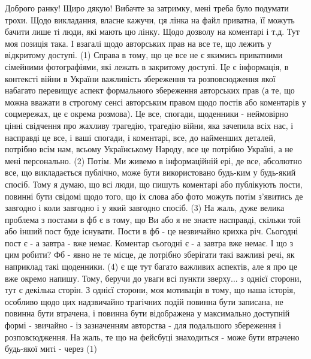  
 
 
 
 

Доброго ранку! Щиро дякую! Вибачте за затримку, мені треба було подумати трохи. 
Щодо викладання, власне кажучи, ця лінка на файл
приватна, її можуть бачити лише ті люди, які мають цю лінку. Щодо дозволу на
коментарі і т.д. Тут моя позиція така.  І взагалі щодо авторських прав на все
те, що лежить у відкритому доступі. (1)  Справа в тому, що це все не є якимись
приватними сімейними фотографіями, які лежать в закритому доступі. Це є
інформація, в контексті війни в України важливість збереження та розповсюдження
якої набагато перевищує аспект формального збереження авторських прав (а те,
що можна вважати в строгому сенсі авторським правом щодо постів або коментарів у соцмережах, це є окрема
розмова). Це все,
спогади, щоденники - неймовірно цінні свідчення про жахливу трагедію, трагедію
війни, яка зачепила всіх нас, і насправді це все, і ваші спогади, і коментарі,
все, до найменших деталей, потрібно всім нам, всьому Українському Народу, все
це потрібно Україні, а не мені персонально. (2) Потім. Ми живемо в
інформаційній ері, де все, абсолютно все, що викладається публічно, може бути
використовано будь-ким у будь-який спосіб. Тому я думаю, що всі люди, що пишуть
коментарі або публікують пости, повинні бути свідомі щодо того, що іх слова або
фото можуть потім з'явитись де завгодно і коли завгодно і у який завгодно
спосіб. (3) На жаль, дуже велика проблема з постами в фб є в тому, що Ви або я
не знаєте насправді, скільки той або інший пост буде існувати.  Пости в фб - це
незвичайно крихка річ. Сьогодні пост є - а завтра - вже немає. Коментар
сьогодні є - а завтра вже немає.  І що з цим робити? Фб - явно не те місце, де
потрібно зберігати такі важливі речі, як наприклад такі щоденники. (4) є ще тут багато важливих аспектів, 
але я про це вже окремо напишу.  
Тому, беручи до уваги всі пункти зверху...  з однієї сторони, тут є декілька сторін.
З однієї сторони, моя мотивація в тому, що наша історія, особливо щодо цих
надзвичайно трагічних подій повинна бути записана, не повинна бути втрачена, і
повинна бути відображена у максимально доступній формі - звичайно - із
зазначенням авторства - для подальшого збереження і розповсюдження. На жаль, те
що на фейсбуці знаходиться - може бути втрачено будь-якої миті - через (1)
